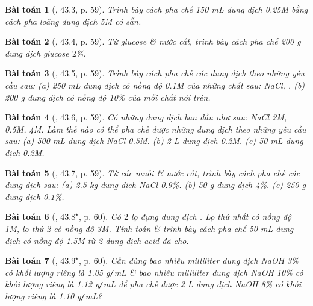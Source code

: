 \documentclass{article}
\newtheorem{baitoan}{Bài toán}
\begin{document}
\begin{baitoan}[\cite{SBT_Hoa_Hoc_8}, 43.3, p. 59]
	Trình bày cách pha chế \emph{150 mL} dung dịch \emph{ 0.25M} bằng cách pha loãng dung dịch \emph{ 5M} có sẵn.
\end{baitoan}

\begin{baitoan}[\cite{SBT_Hoa_Hoc_8}, 43.4, p. 59]
	Từ glucose \emph{} \& nước cất, trình bày cách pha chế \emph{200 g} dung dịch glucose $2$\%.
\end{baitoan}

\begin{baitoan}[\cite{SBT_Hoa_Hoc_8}, 43.5, p. 59]
	Trình bày cách pha chế các dung dịch theo những yêu cầu sau: (a) \emph{250 mL} dung dịch có nồng độ \emph{0.1M} của những chất sau: \emph{NaCl, }. (b) \emph{200 g} dung dịch có nồng độ \emph{10\%} của mỗi chất nói trên.
\end{baitoan}

\begin{baitoan}[\cite{SBT_Hoa_Hoc_8}, 43.6, p. 59]
	Có những dung dịch ban đầu như sau: \emph{NaCl 2M,  0.5M,  4M}. Làm thế nào có thể pha chế được những dung dịch theo những yêu cầu sau: (a) \emph{500 mL} dung dịch \emph{NaCl 0.5M}. (b) \emph{2 L} dung dịch \emph{ 0.2M}. (c) \emph{50 mL} dung dịch \emph{ 0.2M}.
\end{baitoan}

\begin{baitoan}[\cite{SBT_Hoa_Hoc_8}, 43.7, p. 59]
	Từ các muối \& nước cất, trình bày cách pha chế các dung dịch sau: (a) \emph{2.5 kg} dung dịch \emph{NaCl 0.9\%}. (b) \emph{50 g} dung dịch \emph{ 4\%}. (c) \emph{250 g} dung dịch \emph{ 0.1\%}.
\end{baitoan}

\begin{baitoan}[\cite{SBT_Hoa_Hoc_8}, $43.8^\star$, p. 60]
	Có $2$ lọ đựng dung dịch \emph{}. Lọ thứ nhất có nồng độ \emph{1M}, lọ thứ 2 có nồng độ \emph{3M}. Tính toán \& trình bày cách pha chế \emph{50 mL} dung dịch \emph{} có nồng độ \emph{1.5M} từ 2 dung dịch acid đã cho.
\end{baitoan}

\begin{baitoan}[\cite{SBT_Hoa_Hoc_8}, $43.9^\star$, p. 60]
	Cần dùng bao nhiêu milliliter dung dịch \emph{NaOH 3\%} có khối lượng riêng là \emph{1.05 g\texttt{/}mL} \& bao nhiêu milliliter dung dịch \emph{NaOH 10\%} có khối lượng riêng là \emph{1.12 g\texttt{/}mL} để pha chế được \emph{2 L} dung dịch \emph{NaOH 8\%} có khối lượng riêng là \emph{1.10 g\texttt{/}mL?}
\end{baitoan}
\end{document}
